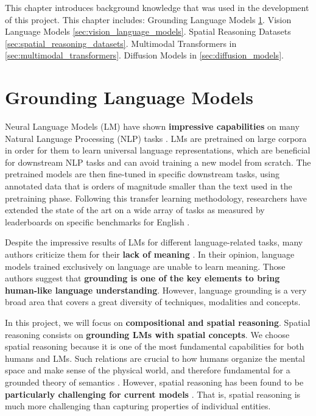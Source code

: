 This chapter introduces background knowledge that was used in the development of this project. This chapter includes: Grounding Language Models \cref{sec:grounding_language_models}. Vision Language Models \cref{sec:vision_language_models}. Spatial Reasoning Datasets \cref{sec:spatial_reasoning_datasets}. Multimodal Transformers in \cref{sec:multimodal_transformers}. Diffusion Models in \cref{sec:diffusion_models}.

\section{Grounding Language Models} \label{sec:grounding_language_models}

Neural Language Models (LM) have shown \textbf{impressive capabilities} on many Natural Language Processing (NLP) tasks \cite{wang2019superglue, brown2020language, chowdhery2022palm}. LMs are pretrained on large corpora in order for them to learn universal language representations, which are beneficial for downstream NLP tasks and can avoid training a new model from scratch. The pretrained models are then fine-tuned in specific downstream tasks, using annotated data that is orders of magnitude smaller than the text used in the pretraining phase. Following this transfer learning methodology, researchers have extended the state of the art on a wide array of tasks as measured by leaderboards on specific benchmarks for English \cite{bommasani2021opportunities, wang2019superglue}.

Despite the impressive results of LMs for different language-related tasks, many authors criticize them for their \textbf{lack of meaning} \cite{bender2020climbing, bender2021dangers}. In their opinion, language models trained exclusively on language are unable to learn meaning. Those authors suggest that \textbf{grounding is one of the key elements to bring human-like language understanding}. However, language grounding is a very broad area that covers a great diversity of techniques, modalities and concepts. 

In this project, we will focus on \textbf{compositional and spatial reasoning}. Spatial reasoning consists on \textbf{grounding LMs with spatial concepts}. We choose spatial reasoning because it is one of the most fundamental capabilities for both humans and LMs. Such relations are crucial to how humans organize the mental space and make sense of the physical world, and therefore fundamental for a grounded theory of semantics \cite{levinson2003space}. However, spatial reasoning has been found to be \textbf{particularly challenging for current models} \cite{akula2020words}. That is, spatial reasoning is much more challenging than capturing properties of individual entities.

